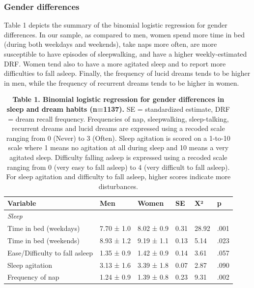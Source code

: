 \subsubsection*{Gender differences}
Table 1 depicts the summary of the binomial logistic regression for gender differences. In our sample, as compared to men, women spend more time in bed (during both weekdays and weekends), take naps more often, are more susceptible to have episodes of sleepwalking, and have a higher weekly-estimated DRF. Women tend also to have a more agitated sleep and to report more difficulties to fall asleep. Finally, the frequency of lucid dreams tends to be higher in men, while the frequency of recurrent dreams tends to be higher in women.

\begin{table}[!htb]
    \caption*{\textbf{Table 1. Binomial logistic regression for gender differences in sleep and dream habits (n=1137).} SE = standardized estimate, DRF = dream recall frequency. Frequencies of nap, sleepwalking, sleep-talking, recurrent dreams and lucid dreams are expressed using a recoded scale ranging from 0 (Never) to 3 (Often). Sleep agitation is scored on a 1-to-10 scale where 1 means no agitation at all during sleep and 10 means a very agitated sleep. Difficulty falling asleep is expressed using a recoded scale ranging from 0 (very easy to fall asleep) to 4 (very difficult to fall asleep). For sleep agitation and difficulty to fall asleep, higher scores indicate more disturbances.}
    \begin{tabularx}{\textwidth}{lllXXX}
    \toprule
    Variable                       & Men                       & Women         & SE    & X²    & p        \\ \midrule
    \emph{Sleep}                   &                           &               &       &       &          \\
    Time in bed (weekdays)         & 7.70 ± 1.0                & 8.02 ± 0.9    & 0.31  & 28.92 & .001     \\
    Time in bed (weekends)         & 8.93 ± 1.2                & 9.19 ± 1.1    & 0.13  & 5.14  & .023     \\
    Ease/Difficulty to fall asleep & 1.35 ± 0.9                & 1.42 ± 0.9    & 0.14  & 3.61  & .057     \\
    Sleep agitation                & 3.13 ± 1.6                & 3.39 ± 1.8    & 0.07  & 2.87  & .090     \\
    Frequency of nap               & 1.24 ± 0.9                & 1.39 ± 0.8    & 0.23  & 9.31  & .002     \\

\end{tabularx}
\end{table}
